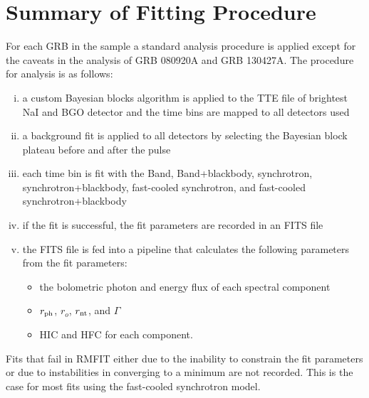 \section{Summary of Fitting Procedure}
For each GRB in the sample a standard analysis procedure is applied
except for the caveats in the analysis of GRB 080920A and GRB
130427A. The procedure for analysis is as follows:
\begin{enumerate}[(i)]
\item a custom Bayesian blocks algorithm is applied to the TTE file of
  brightest NaI and BGO detector and the time bins are mapped to all
  detectors used
\item a background fit is applied to all detectors by selecting the
  Bayesian block plateau before and after the pulse
\item each time bin is fit with the Band, Band+blackbody, synchrotron,
  synchrotron+blackbody, fast-cooled synchrotron, and fast-cooled
  synchrotron+blackbody
\item if the fit is successful, the fit parameters are recorded in an
  FITS file
\item the FITS file is fed into a pipeline that calculates the
  following parameters from the fit parameters:
  \begin{itemize}
  \item the bolometric photon and energy flux of each spectral component
  \item $r_{\rm ph}$, $r_o$, $r_{\rm nt}$, and $\Gamma$
  \item HIC and HFC for each component.
  \end{itemize}

\end{enumerate}
Fits that fail in RMFIT either due to the inability to constrain the
fit parameters or due to instabilities in converging to a minimum are
not recorded. This is the case for most fits using the fast-cooled
synchrotron model.
%
%



